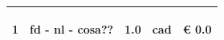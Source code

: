 \documentclass[a4paper]{article}
\begin{document}
\begin{tabular}{ | L{10mm} |  L{86mm} | L{12mm} | L{12mm} | L{16mm} | }
                                     \vspace{2.5mm}
                                     \begin{spacing}{0}
                                  1
                                     \end{spacing} &
                                     \vspace{2.5mm}
                                     \begin{spacing}{0}
                                  fd - nl - \newline cosa??
                                     \end{spacing} &
                                     \vspace{2.5mm}
                                     \begin{spacing}{0}
                                  1.0
                                     \end{spacing} &
                                     \vspace{2.5mm}
                                     \begin{spacing}{0}
                                  cad
                                     \end{spacing} &
                                     \vspace{2.5mm}
                                     \begin{spacing}{0}
                                       \euro\hfill 
                                   0.0
                                     \end{spacing} \\
                                     \hline
    

\end{tabular}
\end{document}
